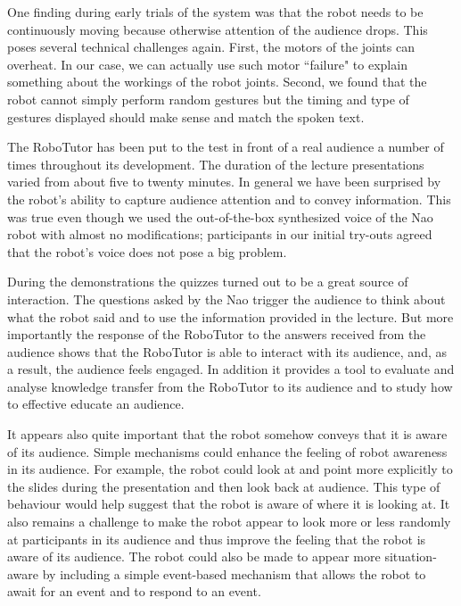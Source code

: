 One finding during early trials of the system was that the robot needs to be continuously moving because otherwise attention of the audience drops. This poses several technical challenges again. First, the motors of the joints can overheat. In our case, we can actually use such motor ``failure" to explain something about the workings of the robot joints. Second, we found that the robot cannot simply perform random gestures but the timing and type of gestures displayed should make sense and match the spoken text.

The RoboTutor has been put to the test in front of a real audience a number of times throughout its development. The duration of the lecture presentations varied from about five to twenty minutes. In general we have been surprised by the robot's ability to capture audience attention and to convey information. This was true even though we used the out-of-the-box synthesized voice of the Nao robot with almost no modifications; participants in our initial try-outs agreed that the robot's voice does not pose a big problem. 

During the demonstrations the quizzes turned out to be a great source of interaction. The questions asked by the Nao trigger the audience to think about what the robot said and to use the information provided in the lecture. But more importantly the response of the RoboTutor to the answers received from the audience shows that the RoboTutor is able to interact with its audience, and, as a result, the audience feels engaged. In addition it provides a tool to evaluate and analyse knowledge transfer from the RoboTutor to its audience and to study how to effective educate an audience.

It appears also quite important that the robot somehow conveys that it is aware of its audience. Simple mechanisms could enhance the feeling of robot awareness in its audience. For example, the robot could look at and point more explicitly to the slides during the presentation and then look back at audience. This type of behaviour would help suggest that the robot is aware of where it is looking at. It also remains a challenge to make the robot appear to look more or less randomly at participants in its audience and thus improve the feeling that the robot is aware of its audience. The robot could also be made to appear more situation-aware by including a simple event-based mechanism that allows the robot to await for an event and to respond to an event.
